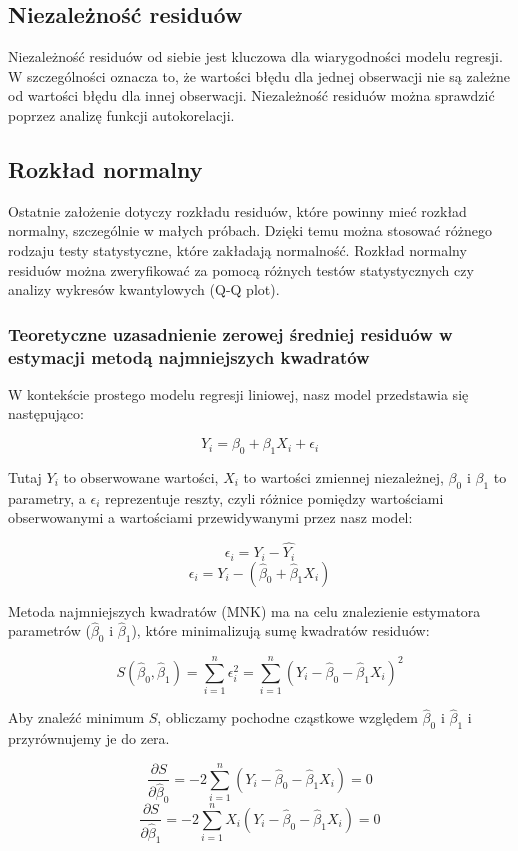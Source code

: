 \documentclass{article}
\begin{document}
\subsection{Niezależność residuów}
Niezależność residuów od siebie jest kluczowa dla wiarygodności modelu regresji. W szczególności oznacza to, że wartości błędu dla jednej obserwacji nie są zależne od wartości błędu dla innej obserwacji. Niezależność residuów można sprawdzić poprzez analizę funkcji autokorelacji.

\subsection{Rozkład normalny}
Ostatnie założenie dotyczy rozkładu residuów, które powinny mieć rozkład normalny, szczególnie w małych próbach. Dzięki temu można stosować różnego rodzaju testy statystyczne, które zakładają normalność. Rozkład normalny residuów można zweryfikować za pomocą różnych testów statystycznych czy analizy wykresów kwantylowych (Q-Q plot).

\subsubsection{Teoretyczne uzasadnienie zerowej średniej residuów w estymacji metodą najmniejszych kwadratów}

W kontekście prostego modelu regresji liniowej, nasz model przedstawia się następująco:

\[ Y_i = \beta_0 + \beta_1X_i + \epsilon_i \]

Tutaj \(Y_i\) to obserwowane wartości, \(X_i\) to wartości zmiennej niezależnej, \(\beta_0\) i \(\beta_1\) to parametry, a \(\epsilon_i\) reprezentuje reszty, czyli różnice pomiędzy wartościami obserwowanymi a wartościami przewidywanymi przez nasz model:

\[ \epsilon_i = Y_i - \hat{Y_i} \]
\[ \epsilon_i = Y_i - (\hat{\beta}_0 + \hat{\beta}_1X_i) \]

Metoda najmniejszych kwadratów (MNK) ma na celu znalezienie estymatora parametrów (\(\hat{\beta}_0\) i \(\hat{\beta}_1\)), które minimalizują sumę kwadratów residuów:

\[ S(\hat{\beta}_0, \hat{\beta}_1) = \sum_{i=1}^{n} \epsilon_i^2 = \sum_{i=1}^{n} (Y_i - \hat{\beta}_0 - \hat{\beta}_1X_i)^2 \]

Aby znaleźć minimum \(S\), obliczamy pochodne cząstkowe względem \(\hat{\beta}_0\) i \(\hat{\beta}_1\) i przyrównujemy je do zera.

\[ \frac{\partial S}{\partial \hat{\beta}_0} = -2 \sum_{i=1}^{n} (Y_i - \hat{\beta}_0 - \hat{\beta}_1X_i) = 0 \]
\[ \frac{\partial S}{\partial \hat{\beta}_1} = -2 \sum_{i=1}^{n} X_i(Y_i - \hat{\beta}_0 - \hat{\beta}_1X_i) = 0 \]
\end{document}
